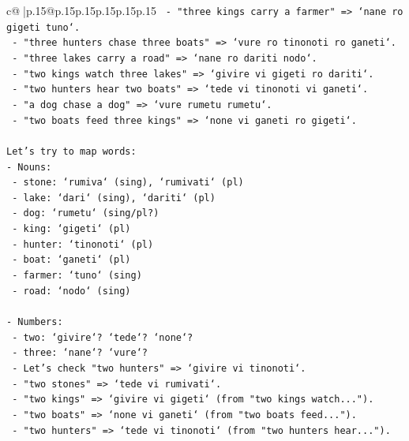 \documentclass{article}
\begin{document}
{\begin{supertabular}{c@{$\;$}|p{.15\linewidth}@{}p{.15\linewidth}p{.15\linewidth}p{.15\linewidth}p{.15\linewidth}p{.15\linewidth}}
{{{\texttt{                             {-} "three kings carry a farmer" => `nane ro gigeti tuno`.} \\
\texttt{                             {-} "three hunters chase three boats" => `vure ro tinonoti ro ganeti`.} \\
\texttt{                             {-} "three lakes carry a road" => `nane ro dariti nodo`.} \\
\texttt{                             {-} "two kings watch three lakes" => `givire vi gigeti ro dariti`.} \\
\texttt{                             {-} "two hunters hear two boats" => `tede vi tinonoti vi ganeti`.} \\
\texttt{                             {-} "a dog chase a dog" => `vure rumetu rumetu`.} \\
\texttt{                             {-} "two boats feed three kings" => `none vi ganeti ro gigeti`.} \\
\\ 
\texttt{Let's try to map words:} \\
\texttt{{-} Nouns:} \\
\texttt{  {-} stone: `rumiva` (sing), `rumivati` (pl)} \\
\texttt{  {-} lake: `dari` (sing), `dariti` (pl)} \\
\texttt{  {-} dog: `rumetu` (sing/pl?)} \\
\texttt{  {-} king: `gigeti` (pl)} \\
\texttt{  {-} hunter: `tinonoti` (pl)} \\
\texttt{  {-} boat: `ganeti` (pl)} \\
\texttt{  {-} farmer: `tuno` (sing)} \\
\texttt{  {-} road: `nodo` (sing)} \\
\\ 
\texttt{{-} Numbers:} \\
\texttt{  {-} two: `givire`? `tede`? `none`?} \\
\texttt{  {-} three: `nane`? `vure`?} \\
\texttt{  {-} Let's check "two hunters" => `givire vi tinonoti`.} \\
\texttt{  {-} "two stones" => `tede vi rumivati`.} \\
\texttt{  {-} "two kings" => `givire vi gigeti` (from "two kings watch...").} \\
\texttt{  {-} "two boats" => `none vi ganeti` (from "two boats feed...").} \\
\texttt{  {-} "two hunters" => `tede vi tinonoti` (from "two hunters hear...").} \\
}}}
\end{supertabular}}
\end{document}
